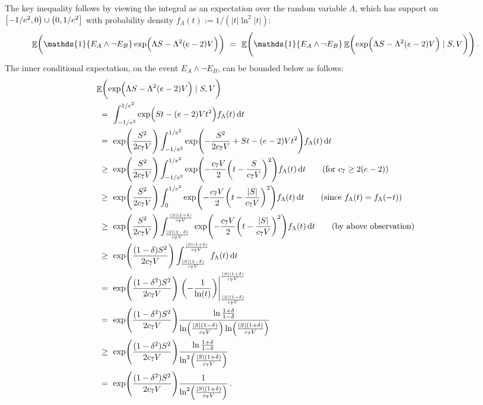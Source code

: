 \documentclass[11pt]{article}
\DeclareMathOperator{\E}{\mathbb{E}}
\theoremstyle{remark}
\theoremstyle{definition}
\renewcommand\abs[1]{|#1|} %
\newcommand\ind[1]{\ensuremath{\mathds{1}\{#1\}}}
\newcommand\Parens[1]{\mleft(#1\mright)}
\begin{document}
The key inequality follows by viewing the integral as an expectation
over the random variable $\Lambda$, which has support on
$\intco{-1/e^2,0} \cup \intoc{0,1/e^2}$ with probability density
$f_\Lambda(t) := 1/(\abs{t}\ln^2\abs{t})$:
\begin{align*}
  \E\Parens{
    \ind{E_A \wedge \neg E_B}
    \exp\Parens{ \Lambda S - \Lambda^2 (e-2) V }
  }
  & \ = \
  \E\Parens{
    \ind{E_A \wedge \neg E_B}
    \E\Parens{
      \exp\Parens{ \Lambda S - \Lambda^2 (e-2) V }
      \mid S,V
    }
  }
  \,.
\end{align*}
The inner conditional expectation, on the event $E_A \wedge \neg E_B$,
can be bounded below as follows:
\begin{align*}
  \lefteqn{
    \E\Parens{
      \exp\Parens{ \Lambda S - \Lambda^2 (e-2) V }
      \mid S,V
    }
  } \\
  & \ = \
  \int_{-1/e^2}^{1/e^2}
  \exp\Parens{ S t - (e-2) V t^2 }
  f_\Lambda(t) \dif{t}
  \\
  & \ = \
  \exp\Parens{\frac{S^2}{2c_7V}}
  \int_{-1/e^2}^{1/e^2}
  \exp\Parens{
    -\frac{S^2}{2c_7V}
    + S t - (e-2) V t^2
  }
  f_\Lambda(t) \dif{t}
  \\
  & \ \geq \
  \exp\Parens{\frac{S^2}{2c_7V}}
  \int_{-1/e^2}^{1/e^2}
  \exp\Parens{
    -\frac{c_7V}{2}
    \Parens{ t - \frac{S}{c_7V} }^2
  }
  f_\Lambda(t) \dif{t}
  \qquad \text{(for $c_7 \geq 2(e-2)$)}
  \\
  & \ \geq \
  \exp\Parens{\frac{S^2}{2c_7V}}
  \int_0^{1/e^2}
  \exp\Parens{
    -\frac{c_7V}{2}
    \Parens{ t - \frac{|S|}{c_7V} }^2
  }
  f_\Lambda(t) \dif{t}
  \qquad \text{(since $f_\Lambda(t) = f_\Lambda(-t)$)}
  \\
  & \ \geq \
  \exp\Parens{\frac{S^2}{2c_7V}}
  \int_{\frac{|S|(1-\delta)}{c_7V}}^{\frac{|S|(1+\delta)}{c_7V}}
  \exp\Parens{
    -\frac{c_7V}{2}
    \Parens{ t - \frac{|S|}{c_7V} }^2
  }
  f_\Lambda(t) \dif{t}
  \qquad \text{(by above observation)}
  \\
  & \ \geq \
  \exp\Parens{\frac{(1-\delta)S^2}{2c_7V}}
  \int_{\frac{|S|(1-\delta)}{c_7V}}^{\frac{|S|(1+\delta)}{c_7V}}
  f_\Lambda(t) \dif{t}
  \\
  & \ = \
  \exp\Parens{\frac{(1-\delta^2)S^2}{2c_7V}}
  \left.
  \Parens{
    -\frac{1}{\ln(t)}
  }
  \right\vert_{\frac{|S|(1-\delta)}{c_7V}}^{\frac{|S|(1+\delta)}{c_7V}}
  \\
  & \ = \
  \exp\Parens{\frac{(1-\delta^2)S^2}{2c_7V}}
  \frac{\ln\frac{1+\delta}{1-\delta}}
  {\ln\Parens{\frac{|S|(1-\delta)}{c_7V}}\ln\Parens{\frac{|S|(1+\delta)}{c_7V}}}
  \\
  & \ \geq \
  \exp\Parens{\frac{(1-\delta^2)S^2}{2c_7V}}
  \frac{\ln\frac{1+\delta}{1-\delta}}
  {\ln^2\Parens{\frac{|S|(1+\delta)}{c_7V}}}
  \\
  & \ = \
  \exp\Parens{\frac{(1-\delta^2)S^2}{2c_7V}}
  \frac{1}{\ln^2\Parens{\frac{|S|(1+\delta)}{c_7V}}}
  \,.
\end{align*}
\end{document}
